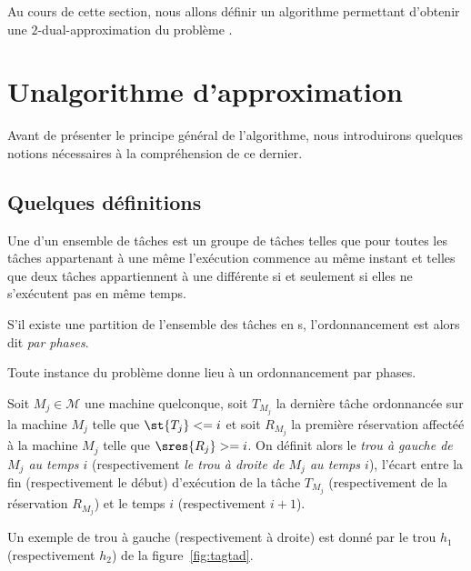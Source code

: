 \documentclass[a4paper,9pt]{article}
\begin{document}
Au cours de cette section, nous allons définir un algorithme permettant d'obtenir une
$2$-dual-approximation du problème \unitfisched{}. 

\section{Unalgorithme d'approximation}

Avant de présenter le principe général de l'algorithme, nous introduirons quelques notions
nécessaires à la compréhension de ce dernier.

\subsection{Quelques définitions}

\begin{ndf}
    Une \tphase{} d'un ensemble de tâches est un groupe de tâches telles que pour toutes les tâches
    appartenant à une même \tphase{} l'exécution commence au même instant et telles que deux tâches
    appartiennent à une \tphase{} différente si et seulement si elles ne s'exécutent pas en même
    temps.

    S'il existe une partition de l'ensemble des tâches en \tphase{}s, l'ordonnancement est alors dit
    \emph{par phases}.
\end{ndf}

\begin{nprop}
    Toute instance du problème \unitfisched{} donne lieu à un ordonnancement par phases.
\end{nprop}


\begin{ndf}
    Soit $M_j \in \mathcal{M}$ une machine quelconque, soit $T_{M_j}$ la dernière tâche ordonnancée
    sur la machine $M_j$ telle que $\st{T_j} <= i$ et soit $R_{M_j}$ la première réservation
    affectéé à la machine $M_j$ telle que $\sres{R_j} >= i$. On définit alors le \emph{trou à gauche
    de $M_j$ au temps $i$} (respectivement \emph{le trou à droite de $M_j$ au temps $i$}), l'écart
    entre la fin (respectivement le début) d'exécution de la tâche $T_{M_j}$ (respectivement de la
    réservation $R_{M_j}$) et le temps $i$ (respectivement $i+1$).

    Un exemple de trou à gauche (respectivement à droite) est donné par le trou $h_1$
    (respectivement $h_2$) de la figure~\ref{fig:tagtad}.
\end{ndf}
\end{document}
